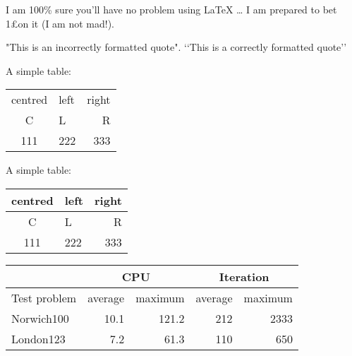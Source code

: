 \documentclass[12pt]{scrartcl}
\begin{document}
I am 100\% sure you’ll have no problem
using \LaTeX{} \ldots{} I am prepared to bet
1\pounds on it (I am not mad!).

"This is an incorrectly formatted quote".
‘‘This is a correctly formatted quote’’

A simple table:
\begin{center}
	\begin{tabular}{clr}
		centred & left & right \\
		C & L & R \\
		111 & 222 & 333
	\end{tabular}
\end{center}


A simple table:
\begin{center}
	\begin{tabular}{clr} \hline
		centred & left & right \\ \hline\hline
		C & L & R \\
		111 & 222 & 333 \\ \hline
	\end{tabular}
\end{center}

\begin{center}
	\begin{tabular}{|l|r|r|r|r|} \cline{2-5}
		\multicolumn{1}{c}{} & \multicolumn{2}{|c|}{CPU} &
		\multicolumn{2}{|c|}{Iteration} \\ \hline
		Test problem & average & maximum & average & maximum \\
		\hline \hline
		Norwich100 & 10.1 & 121.2 & 212 & 2333 \\
		London123 & 7.2 & 61.3 & 110 & 650 \\
		\hline
	\end{tabular}
\end{center}
\end{document}
